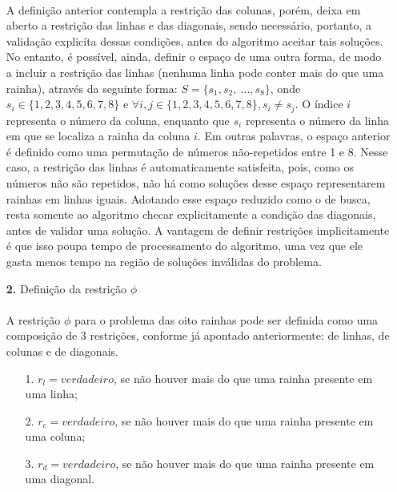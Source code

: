 \documentclass{report}
\begin{document}
\begin{itemize}
	\paragraph{} A definição anterior contempla a restrição das colunas, porém, deixa em aberto a restrição das linhas e das diagonais, sendo necessário, portanto, a validação explicíta dessas condições, antes do algoritmo aceitar tais soluções. No entanto, é possível, ainda, definir o espaço de uma outra forma, de modo a incluir a restrição das linhas (nenhuma linha pode conter mais do que uma rainha), através da seguinte forma: $S = \{s_1, s_2, \ ..., s_8\}$, onde $s_i \in \{1, 2, 3, 4, 5, 6, 7, 8 \}$ e $\forall i, j \in \{1, 2, 3, 4, 5, 6, 7, 8\}, s_i \neq s_j$. O índice $i$ representa o número da coluna, enquanto que $s_i$ representa o número da linha em que se localiza a rainha da coluna $i$. Em outras palavras, o espaço anterior é definido como uma permutação de números não-repetidos entre 1 e 8. Nesse caso, a restrição das linhas é automaticamente satisfeita, pois, como os números não são repetidos, não há como soluções desse espaço representarem rainhas em linhas iguais. Adotando esse espaço reduzido como o de busca, resta somente ao algoritmo checar explicitamente a condição das diagonais, antes de validar uma solução. A vantagem de definir restrições implicitamente é que isso poupa tempo de processamento do algoritmo, uma vez que ele gasta menos tempo na região de soluções inválidas do problema.\\
	
	\item[\textbf{2.}] Definição da restrição $\phi$
	
	\paragraph{} A restrição $\phi$ para o problema das oito rainhas pode ser definida como uma composição de 3 restrições, conforme já apontado anteriormente: de linhas, de colunas e de diagonais.
	
	\begin{itemize}
		
		\item[1.] $r_l = verdadeiro$, se não houver mais do que uma rainha presente em uma linha;
		
		\item[2.] $r_c = verdadeiro$, se não houver mais do que uma rainha presente em uma coluna;
		
		\item[3.] $r_d = verdadeiro$, se não houver mais do que uma rainha presente em uma diagonal.	
		

\end{itemize}
\end{itemize}
\end{document}

